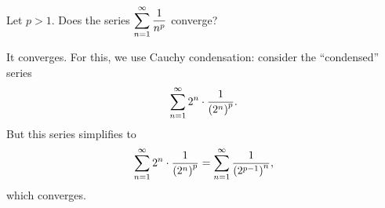 \begin{example}
\label{example:p-series-p-ge-1}
Let $p > 1$.  Does the series $\displaystyle\sum_{n=1}^\infty \displaystyle\frac{1}{n^p}$ converge?
\end{example}

\begin{solution}
  It converges.  For this, we use Cauchy condensation: consider the ``condensed'' series
$$
\displaystyle\sum_{n=1}^\infty 2^n \cdot \displaystyle\frac{1}{\left( 2^n \right)^p}.
$$
But this series simplifies to
$$
\displaystyle\sum_{n=1}^\infty 2^n \cdot \displaystyle\frac{1}{\left( 2^n \right)^p} =
\displaystyle\sum_{n=1}^\infty  \displaystyle\frac{1}{\left( 2^{p-1} \right)^n},
$$
which converges.
\end{solution}

